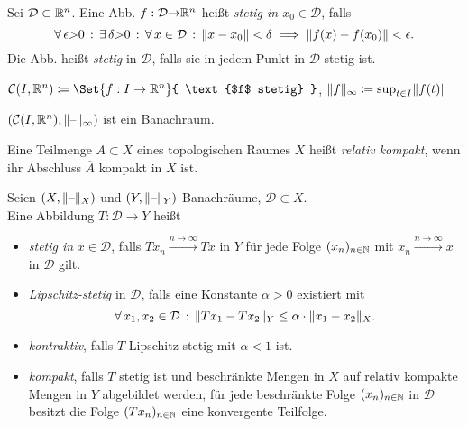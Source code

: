 \documentclass{cheat-sheet}
\newcommand{\D}{\mathcal{D}}
\begin{document}


\begin{defn}
  Sei $\D \subset \R^n$. Eine Abb. $f : \D {\to} \R^n$ heißt \emph{stetig in $x_0 \in \D$}, falls
  \[ \fa{\epsilon {>} 0} \ex{\delta {>} 0} \fa{x \in \D} \norm{x - x_0} < \delta \implies \norm{f(x) - f(x_0)} < \epsilon. \]
  Die Abb. heißt \emph{stetig} in $\D$, falls sie in jedem Punkt in $\D$ stetig ist.
\end{defn}

\begin{nota}
  $\mathcal{C}(I, \R^n) \coloneqq \Set{ f : I \to \R^n }{ \text{$f$ stetig} }$, $\lVert f\rVert_\infty \coloneqq \sup_{t \in I} \lVert f(t)\rVert$
\end{nota}


\begin{bem}
  $(\mathcal{C}(I, \mathbb{R}^n), \lVert\text{--}\rVert_\infty)$ ist ein Banachraum.
\end{bem}

\begin{defn}
  Eine Teilmenge $A \subset X$ eines topologischen Raumes $X$ heißt \emph{relativ kompakt}, wenn ihr Abschluss $\overline{A}$ kompakt in $X$ ist.
\end{defn}

\begin{defn}
  Seien $(X, \lVert\text{--}\rVert_X)$ und $(Y, \lVert\text{--}\rVert_Y)$ Banachräume, $\D \subset X$. \\
  Eine Abbildung $T : \D \to Y$ heißt
  \begin{itemize}
    \item \emph{stetig in} $x \in \D$, falls $T x_n \xrightarrow{n \to \infty} T x$ in $Y$ für jede Folge $(x_n)_{n \in \mathbb{N}}$ mit $x_n \xrightarrow{n \to \infty} x$ in $\D$ gilt.
    \item \emph{Lipschitz-stetig} in $\D$, falls eine Konstante $\alpha > 0$ existiert mit
    \[ \fa{x_1, x_2 \in \D} \norm{Tx_1 - Tx_2}_Y \leq \alpha \cdot \norm{x_1 - x_2}_X. \]
    \item \emph{kontraktiv}, falls $T$ Lipschitz-stetig mit $\alpha < 1$ ist.
    \item \emph{kompakt}, falls $T$ stetig ist und beschränkte Mengen in $X$ auf relativ kompakte Mengen in $Y$ abgebildet werden, \dh{} für jede beschränkte Folge $(x_n)_{n \in \mathbb{N}}$ in $\D$ besitzt die Folge $(Tx_n)_{n \in \mathbb{N}}$ eine konvergente Teilfolge.
  \end{itemize}
\end{defn}
\end{document}
